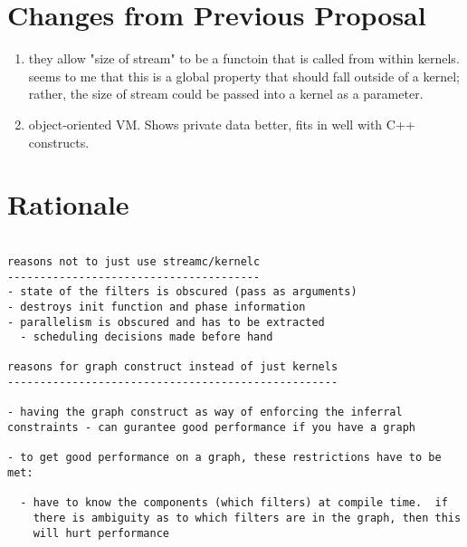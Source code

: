 \section{Changes from Previous Proposal}

\begin{enumerate}

\item they allow "size of stream" to be a functoin that is called from
within kernels.  seems to me that this is a global property that
should fall outside of a kernel; rather, the size of stream could be
passed into a kernel as a parameter.

\item object-oriented VM.  Shows private data better, fits in well
with C++ constructs.

\end{enumerate}

\section{Rationale}

\begin{verbatim}

reasons not to just use streamc/kernelc
---------------------------------------
- state of the filters is obscured (pass as arguments)
- destroys init function and phase information
- parallelism is obscured and has to be extracted
  - scheduling decisions made before hand

reasons for graph construct instead of just kernels
---------------------------------------------------

- having the graph construct as way of enforcing the inferral
constraints - can gurantee good performance if you have a graph

- to get good performance on a graph, these restrictions have to be
met:

  - have to know the components (which filters) at compile time.  if
    there is ambiguity as to which filters are in the graph, then this
    will hurt performance

\end{verbatim}